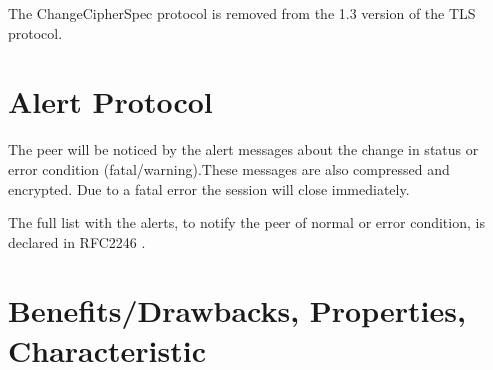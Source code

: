 The ChangeCipherSpec protocol is removed from the 1.3 version of the TLS protocol.

\section{Alert Protocol}
\label{sec:alert_protocol}
The peer will be noticed by the alert messages about the change in status or error condition (fatal/warning).These messages are also compressed and encrypted. Due to a fatal error the session will close immediately. 

The full list with the alerts, to notify the peer of normal or error condition, is declared in RFC2246 \cite{rfc2246}. \cite{W.Stalling} \cite{ms:overview}

\section{Benefits/Drawbacks, Properties, Characteristic}
\label{sec:introduction_suggestions}



